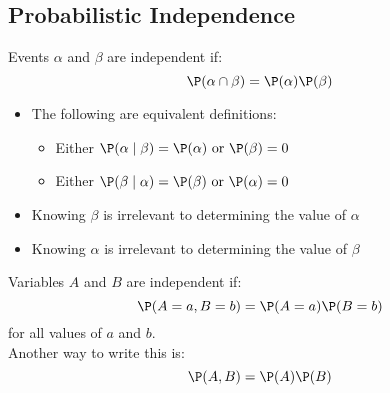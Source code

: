 \subsection{Probabilistic Independence}
	\begin{frame}
		Events $\alpha$ and $\beta$ are independent if:
			\[ \P( \alpha \cap \beta ) = \P( \alpha ) \P( \beta ) \]
		\begin{itemize}
			\item The following are equivalent definitions:
			\begin{itemize}
				\item Either $\P( \alpha \mid \beta ) = \P( \alpha ) \text{ or } \P( \beta ) = 0$
				\item Either $\P( \beta \mid \alpha ) = \P( \beta ) \text{ or } \P( \alpha ) = 0$
			\end{itemize}
			\item Knowing $\beta$ is irrelevant to determining the value of $\alpha$
			\item Knowing $\alpha$ is irrelevant to determining the value of $\beta$
		\end{itemize}
	\end{frame}
	\begin{frame}
		Variables $A$ and $B$ are independent if:
			\[ \P( A = a , B = b ) = \P( A = a ) \P( B = b ) \]
		for all values of $a$ and $b$.\\
		Another way to write this is:
			\[ \P( A , B ) = \P( A ) \P( B ) \]
	\end{frame}